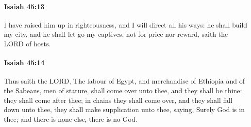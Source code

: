 		\paragraph{Isaiah 45:13} %
			\label{ISAIAH-45-13}

			I have raised him up in righteousness, and I will direct all his ways: he shall build my city, and he shall let go my captives, not for price nor reward, saith the LORD of hosts.


		\paragraph{Isaiah 45:14} %
			\label{ISAIAH-45-14}

			Thus saith the LORD, The labour of Egypt, and merchandise of Ethiopia and of the Sabeans, men of stature, shall come over unto thee, and they shall be thine: they shall come after thee; in chains they shall come over, and they shall fall down unto thee, they shall make supplication unto thee, saying, Surely God is in thee; and there is none else, there is no God.

